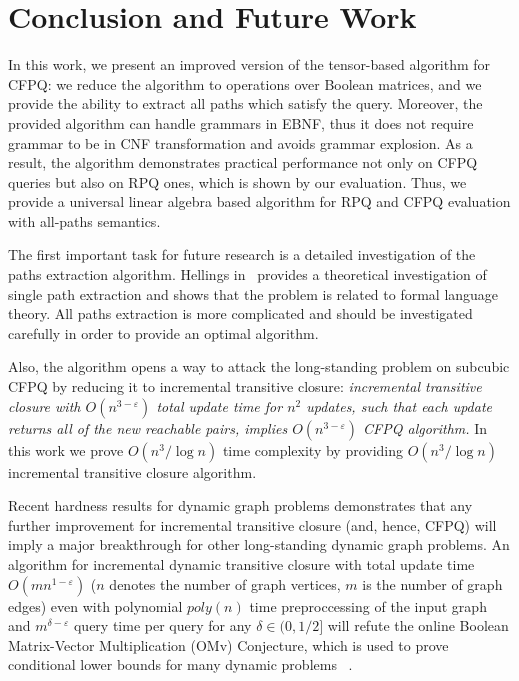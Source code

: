 \section{Conclusion and Future Work}

In this work, we present an improved version of the tensor-based algorithm for CFPQ: we reduce the algorithm to operations over Boolean matrices, and we provide the ability to extract all paths which satisfy the query.
Moreover, the provided algorithm can handle grammars in EBNF, thus it does not require grammar to be in CNF transformation and avoids grammar explosion.
As a result, the algorithm demonstrates practical performance not only on CFPQ queries but also on RPQ ones, which is shown by our evaluation. 
Thus, we provide a universal linear algebra based algorithm for RPQ and CFPQ evaluation with all-paths semantics.

The first important task for future research is a detailed investigation of the paths extraction algorithm.
Hellings in~\cite{HellSinglePath} provides a theoretical investigation of single path extraction and shows that the problem is related to formal language theory.
All paths extraction is more complicated and should be investigated carefully in order to provide an optimal algorithm.

Also, the algorithm opens a way to attack the long-standing problem on subcubic CFPQ by reducing it to incremental transitive closure: \textit{incremental transitive closure with $O(n^{3-\varepsilon})$ total update time for $n^2$ updates, such that each update returns all of the new reachable pairs, implies $O(n^{3-\varepsilon})$ CFPQ algorithm.}
In this work we prove $O(n^3/\log{n})$ time complexity by providing $O(n^3/\log{n})$ incremental transitive closure algorithm. 

Recent hardness results for dynamic graph problems demonstrates that any further improvement for incremental transitive closure (and, hence, CFPQ) will imply a major breakthrough for other long-standing dynamic graph problems. An algorithm for incremental dynamic transitive closure with total update time $O(mn^{1-\varepsilon})$ ($n$ denotes the number of graph vertices, $m$ is the number of graph edges) even with polynomial $poly(n)$ time preproccessing of the input graph and $m^{\delta - \varepsilon}$ query time per query for any $\delta \in (0, 1/2]$ will refute the online Boolean Matrix-Vector Multiplication (OMv) Conjecture, which is used to prove conditional lower bounds for many dynamic problems ~\cite{8948597, 10.1145/2746539.2746609}.


